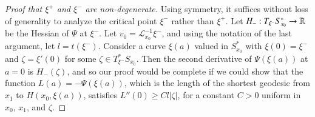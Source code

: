 


\begin{proof}[Proof that $\xi^+$ and $\xi^-$ are non-degenerate]
    Using symmetry, it suffices without loss of generality to analyze the critical point $\xi^-$ rather than $\xi^+$. Let $H_-: T_{\xi^-} S_{x_0}^* \to \operatorname{\mathbb{R}}$ be the Hessian of $\Psi$ at $\xi^-$. Let $v_0 = \mathcal{L}_{x_0}^{-1} \xi^-$, and using the notation of the last argument, let $l = t(\xi^-)$. Consider a curve $\xi(a)$ valued in $S_{x_0}^*$ with $\xi(0) = \xi^-$ and $\zeta = \xi'(0)$ for some $\zeta \in T_{\xi^-}^* S_{x_0}$. Then the second derivative of $\Psi(\xi(a))$ at $a = 0$ is $H_-( \zeta )$, and so our proof would be complete if we could show that the function $L(a) = - \Psi( \xi(a) )$, which is the length of the shortest geodesic from $x_1$ to $H(x_0,\xi(a))$, satisfies $L''(0) \geq C l |\zeta|$, for a constant $C > 0$ uniform in $x_0$, $x_1$, and $\zeta$.


\end{proof}
